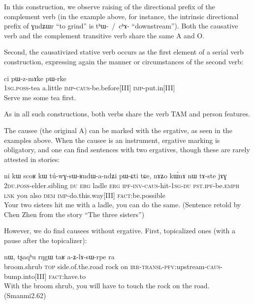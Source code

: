 \documentclass[oldfontcommands,oneside,a4paper,11pt]{article}
\newcommand{\ipa}[1]{{\phon \mbox{#1}}} %
\newcommand{\sg}{\textsc{sg}}
\newcommand{\jg}[1]{\ipa{#1}\index{Japhug #1}}
\newcommand{\wav}[1]{}%
\newcommand{\pfv}{\textsc{pfv}}
\newcommand{\caus}{\textsc{caus}}
\newcommand{\lnk}{\textsc{lnk}}
\newcommand{\dem}{\textsc{dem}}
\newcommand{\du}{\textsc{du}}
\newcommand{\erg}{\textsc{erg}}
\newcommand{\emphat}{\textsc{emph}}
\newcommand{\imp}{\textsc{imp}}
\newcommand{\inv}{\textsc{inv}}
\newcommand{\ipf}{\textsc{ipf}}
\newcommand{\irr}{\textsc{irr}}
\newcommand{\fact}{\textsc{fact}}
\newcommand{\poss}{\textsc{poss}}
\newcommand{\pst}{\textsc{pst}}
\newcommand{\topic}{\textsc{top}}
\newcommand{\transloc}{\textsc{transl}}
\begin{document}
In this construction, we observe raising of the directional prefix of the complement verb (in the example above, for instance, the intrinsic directional prefix of \jg{ɣndʑɯr} ``to grind'' is \ipa{tʰɯ- / cʰɤ-} ``downstream''). Both the causative verb and the complement transitive verb share the same A and O.

Second, the causativized stative verb occurs as the first element of a serial verb construction, expressing again the manner or circumstances of the second verb:

\begin{exe}
\ex
\gll \ipa{a-tʂʰa} 	\ipa{ci} 	\ipa{pɯ-z-mɤke} 	\ipa{pɯ-rke} \\
1\sg{}.\poss{}-tea a.little \imp{}-\caus{}-be.before[III] \imp{}-put.in[III] \\
\glt  Serve me some tea first.
\end{exe} 
As in all such constructions, both verbs share the verb TAM and person features.

 
The causee (the original A) can be marked with the ergative, as seen in the examples above. When the causee is an instrument, ergative marking is obligatory, and one can find sentences with two ergatives, though these are rarely attested in stories:
\begin{exe}
\ex
\gll \ipa{nɤ-pi} 	\ipa{ni} 	\ipa{kɯ} 	\ipa{scoʁ} 	\ipa{kɯ} 	\ipa{tú-wɣ-sɯ-ʁndɯ-a-ndʑi} 	\ipa{pɯ-ɕti} 	\ipa{tɕe,} 	\ipa{nɤʑo} 	\ipa{kɯ́nɤ} 	\ipa{nɯ} 	\ipa{tɤ-ste} 	\ipa{jɤɣ}  \\
2\du{}.\poss{}-elder.sibling \du{} \erg{} ladle \erg{} \ipf{}-\inv{}-\caus{}-hit-1\sg{}-\du{} \pst{}.\ipf{}-be.\emphat{} \lnk{} you also \dem{} \imp{}-do.this.way[III] \fact{}:be.possible  \\
\glt   Your two sisters hit me with a ladle, you can do the same. (Sentence retold by Chen Zhen from the story ``The three sisters'') \wav{8_scoRkW}
\end{exe} 


However, we do find  causees without ergative. First, topicalized ones (with a pause after the topicalizer):
\begin{exe}
\ex
\gll  \ipa{pʰuɲi} 	\ipa{nɯ}, 	\ipa{tʂaqʰu} 	\ipa{rŋgɯ} 	\ipa{taʁ} 	\ipa{a-ʑ-lɤ-sɯ-rpe} 	\ipa{ra}  \\
 broom.shrub \topic{} side.of.the.road rock on \irr{}-\transloc{}-\pfv{}:upstream-\caus{}-bump.into[III] \fact{}:have.to   \\
 \glt   With the broom shrub, you will have to touch the rock on the road. (Smanmi2.62)
\end{exe} 
 
\end{document}
